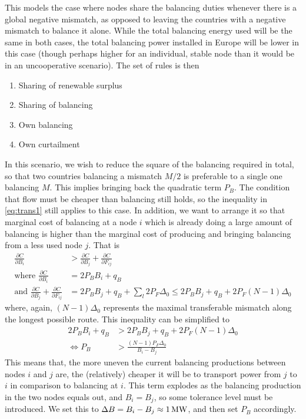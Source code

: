 \documentclass[english,twoside,a4paper,11pt]{article}
\numberwithin{equation}{section}
\begin{document}
This models the case where nodes share the balancing duties whenever
there is a global negative mismatch, as opposed to leaving the
countries with a negative mismatch to balance it alone. While the total
balancing energy used will be the same in both cases, the total
balancing power installed in Europe will be lower in this case (though
perhaps higher for an individual, stable node than it would be in an
uncooperative scenario). The set of
rules is then
\begin{enumerate}
\item Sharing of renewable surplus
\item Sharing of balancing
\item Own balancing
\item Own curtailment
\end{enumerate}
In this scenario, we wish to reduce the
square of the balancing required in total, so that two countries
balancing a mismatch $M/2$ is preferable to a single one balancing
$M$. This implies bringing back the quadratic term $P_B$. The
condition that flow must be cheaper than balancing still holds, so the
inequality in \eqref{eq:trans1} still applies to this case. In
addition, we want to arrange it so that marginal cost of balancing at a
node $i$ which is already doing a large amount of balancing is higher
than the marginal cost of producing and bringing balancing from a less
used node $j$. That is
\begin{align*}
\frac{\partial C}{\partial B_i} 
&> \frac{\partial C}{\partial B_j}+\frac{\partial C}{\partial F_{ij}}\\
\text{where } \frac{\partial C}{\partial B_i}&=2P_B B_i +q_B \\
\text{and } \frac{\partial C}{\partial B_j}+\frac{\partial C}{\partial F_{ij}}
&=2P_B B_j +q_B+\sum_l  2P_F\Delta_0 \leq 2P_BB_j+q_B +2P_F(N-1)\Delta_0
\end{align*}
where, again, $(N-1)\Delta_0$ represents the maximal transferable
mismatch along the longest possible route. This inequality can
be simplified to
\begin{align}
\nonumber 2P_B B_i+q_B &> 2P_B B_j+q_B +2P_F( N-1)\Delta_0\\
\Leftrightarrow
P_B & > \frac{( N-1) P_F\Delta_0}{ B_i - B_j}
\label{eq:bals}
\end{align}
This means that, the more uneven the current balancing productions
between nodes $i$ and $j$ are, the (relatively) cheaper it will be to
transport power from $j$ to $i$ in comparison to balancing at
$i$. This term explodes as the balancing production in the two nodes
equals out, and $B_i=B_j$, so some tolerance level must be
introduced. We set this to $\Delta B=B_i - B_j\approx 1\rm\,MW$, and
then set $P_B$ accordingly.
\end{document}
